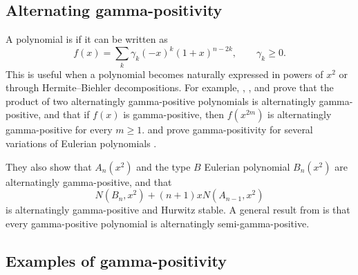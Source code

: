 \subsection[alternatingGammaPositivity]{Alternating gamma-positivity}

A polynomial is
\label{alternatingGammaPositivePolynomial}
if it can be written as
\[
  f(x)=\sum_k \gamma_k(-x)^k(1+x)^{n-2k}, \qquad \gamma_k\geq 0.
\]
This is useful when a polynomial becomes naturally expressed in powers of
$x^2$ or through Hermite--Biehler decompositions. For example,
, ,  and
 prove \cite{MaQiYehYeh2022} that the product of two
alternatingly gamma-positive polynomials is alternatingly gamma-positive,
and that if $f(x)$ is gamma-positive, then $f(x^{2m})$ is alternatingly
gamma-positive for every $m\geq 1$.
 and  prove gamma-positivity
for several variations of Eulerian polynomials \cite{ShareshianWachs2020}.

They also show that $A_n(x^2)$ and the type $B$ Eulerian polynomial
$B_n(x^2)$ are alternatingly gamma-positive, and that
\[
  N(B_n,x^2)+(n+1)xN(A_{n-1},x^2)
\]
is alternatingly gamma-positive and Hurwitz stable. A general result from
\cite{MaQiYehYeh2022} is that every gamma-positive polynomial is
alternatingly semi-gamma-positive.


\subsection[gammaPositiveExamples]{Examples of gamma-positivity}


